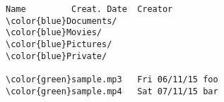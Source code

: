 \begin{Verbatim}[commandchars=\\\{\},codes={\catcode`$=3\catcode`^=7\catcode`_=8},frame=single]
Name         Creat. Date  Creator
\color{blue}Documents/
\color{blue}Movies/
\color{blue}Pictures/
\color{blue}Private/

\color{green}sample.mp3   Fri 06/11/15 foo
\color{green}sample.mp4   Sat 07/11/15 bar
\end{Verbatim}
